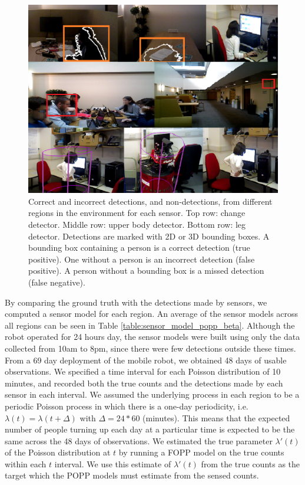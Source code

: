 \begin{figure}[t]
	\centering
	\includegraphics[width=0.95\columnwidth]{./figures/sensor_images.png}
	\caption{Correct and incorrect detections, and non-detections, from different regions in the environment for each sensor. Top row: change detector. Middle row: upper body detector. Bottom row: leg detector. Detections are marked with 2D or 3D bounding boxes. A bounding box containing a person is a correct detection (true positive). One without a person is an incorrect detection (false positive). A person without a bounding box is a missed detection (false negative).}
	\label{fig:single_sensor_rate_transformation}
\end{figure}

By comparing the ground truth with the detections made by sensors, we computed a sensor model for each region. An average of the sensor models across all regions can be seen in Table \ref{table:sensor_model_popp_beta}. Although the robot operated for 24 hours day, the sensor models were built using only the data collected from 10am to 8pm, since there were few detections outside these times. From a 69 day deployment of the mobile robot, we obtained 48 days of usable observations. We specified a time interval for each Poisson distribution of 10 minutes, and recorded both the true counts and the detections made by each sensor in each interval. We assumed the underlying process in each region to be a periodic Poisson process in which there is a one-day periodicity, i.e. $\lambda(t) = \lambda(t + \Delta)$ with $\Delta = 24 * 60$ (minutes). This means that the expected number of people turning up each day at a particular time is expected to be the same across the 48 days of observations. We estimated the true parameter $\lambda'(t)$ of the Poisson distribution at $t$ by running a FOPP model on the true counts within each $t$ interval. We use this estimate of $\lambda'(t)$ from the true counts as the target which the POPP models must estimate from the sensed counts.

